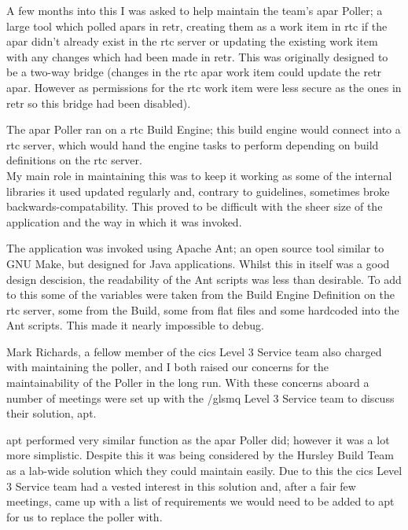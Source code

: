 \documentclass[a4paper,11pt]{report}
\begin{document}
A few months into this I was asked to help maintain the team's \gls{apar} Poller; a large tool 
which polled \gls{apar}s in \gls{retr}, creating them as a work item in \gls{rtc} if the \gls{apar}
didn't already exist in the \gls{rtc} server or updating the existing work item with any changes
which had been made in \gls{retr}. This was originally designed to be a two-way bridge (changes in
the \gls{rtc} \gls{apar} work item could update the \gls{retr} \gls{apar}. However as permissions
for the \gls{rtc} work item were less secure as the ones in \gls{retr} so this bridge had been 
disabled).

The \gls{apar} Poller ran on a \gls{rtc} Build Engine; this build engine would connect into a 
\gls{rtc} server, which would hand the engine tasks to perform depending on build definitions on
the \gls{rtc} server. \\



My main role in maintaining this was to keep it working as some of the internal libraries it used
updated regularly and, contrary to guidelines, sometimes broke backwards-compatability. This 
proved to be difficult with the sheer size of the application and the way in which it was invoked.

The application was invoked using Apache Ant; an open source tool similar to GNU Make, but designed
for Java applications. Whilst this in itself was a good design descision, the readability of the 
Ant scripts was less than desirable. To add to this some of the variables were taken from the 
Build Engine Definition on the \gls{rtc} server, some from the Build, some from flat files and some
hardcoded into the Ant scripts. This made it nearly impossible to debug.

Mark Richards, a fellow member of the \gls{cics} Level 3 Service team also charged with maintaining
the poller, and I both raised our concerns for the maintainability of the Poller in the long run.
With these concerns aboard a number of meetings were set up with the /gls{mq} Level 3 Service team
to discuss their solution, \gls{apt}.

\gls{apt} performed very similar function as the \gls{apar} Poller did; however it was a lot more
simplistic. Despite this it was being considered by the Hursley Build Team as a lab-wide solution
which they could maintain easily. Due to this the \gls{cics} Level 3 Service team had a vested
interest in this solution and, after a fair few meetings, came up with a list of requirements we
would need to be added to \gls{apt} for us to replace the poller with. \\
\end{document}
